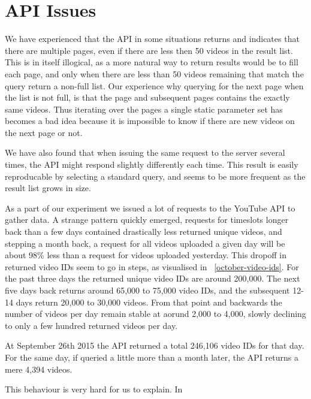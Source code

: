 \section{API Issues}
We have experienced that the API in some situations returns and indicates that
there are multiple pages, even if there are less then 50 videos in the result
list. This is in itself illogical, as a more natural way to return results would
be to fill each page, and only when there are less than 50 videos remaining that
match the query return a non-full list. Our experience why querying for the next
page when the list is not full, is that the page and subsequent pages contains 
the exactly same videos. Thus iterating over the pages a single static parameter
set has becomes a bad idea because it is impossible to know if there are new
videos on the next page or not.  %

We have also found that when issuing the same request to the server several
times, the API might respond slightly differently each time. This result is
easily reproducable by selecting a standard query, and seems to be more
frequent as the result list grows in size. %

As a part of our experiment we issued a lot of requests to the YouTube API to
gather data. A strange pattern quickly emerged, requests for timeslots longer
back than a few days contained drastically less returned unique videos, and 
stepping a month back, a request for all videos uploaded a given day will be 
about 98\% less than a request for videos uploaded yesterday. This dropoff in
returned video IDs seem to go in steps, as visualised in 
~\ref{october-video-ids}. For the past three days the returned unique video IDs
are around 200,000. The next five days back returns around 65,000 to 75,000
video IDs, and the subsequent 12-14 days return 20,000 to 30,000 videos. From
that point and backwards the number of videos per day remain stable at aorund
2,000 to 4,000, slowly declining to only a few hundred returned videos per day.

At September 26th 2015 the API returned a total 246,106 video IDs for that day.
For the same day, if queried a little more than a month later, the API returns
a mere 4,394 videos. 

This behaviour is very hard for us to explain. In 


